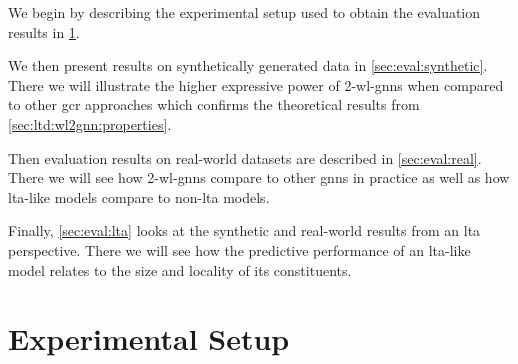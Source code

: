 \begin{enumerate*}[label={\circled{\small\arabic*}}]
	\item We begin by describing the experimental setup used to obtain the evaluation results in \cref{sec:eval:setup}.
	\item We then present results on synthetically generated data in \cref{sec:eval:synthetic}.
	 	There we will illustrate the higher expressive power of 2-\acs{wl}-\acsp{gnn} when compared to other \ac{gcr} approaches which confirms the theoretical results from \cref{sec:ltd:wl2gnn:properties}.
	\item Then evaluation results on real-world datasets are described in \cref{sec:eval:real}.
		There we will see how 2-\acs{wl}-\acsp{gnn} compare to other \acp{gnn} in practice as well as how \acs{lta}-like models compare to non-\acs{lta} models.
	\item Finally, \cref{sec:eval:lta} looks at the synthetic and real-world results from an \ac{lta} perspective.
		There we will see how the predictive performance of an \acs{lta}-like model relates to the size and locality of its constituents.
\end{enumerate*}

\section{Experimental Setup}%
\label{sec:eval:setup}

